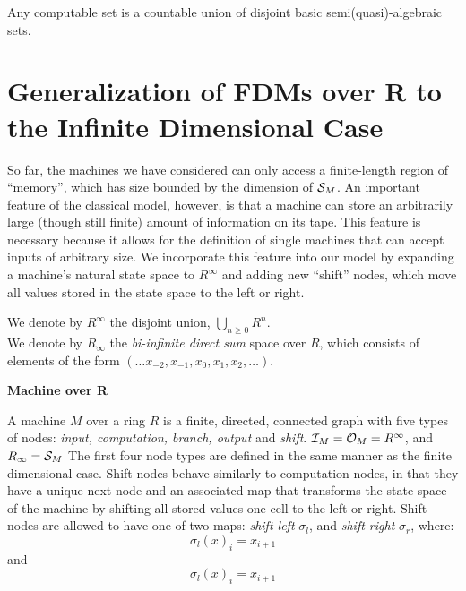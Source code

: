   \begin{corollary}
    Any computable set is a countable union of disjoint basic
    semi(quasi)-algebraic sets.
  \end{corollary}

  \section{Generalization of FDMs over R to the Infinite Dimensional Case}

  So far, the machines we have considered can only access a
  finite-length region of ``memory'', which has size bounded by the
  dimension of $\mathcal{S}_M$.  An important feature of the classical
  model, however, is that a machine can store an arbitrarily large
  (though still finite) amount of information on its tape.  This
  feature is necessary because it allows for the definition of single
  machines that can accept inputs of arbitrary size. We incorporate
  this feature into our model by expanding a machine's natural state
  space to $R^\infty$ and adding new ``shift'' nodes, which move all
  values stored in the state space to the left or right.

  We denote by $R^\infty$ the disjoint union, $\bigcup_{n \geq 0} R^n$.\\

  We denote by $R_\infty$ the \emph{bi-infinite direct sum} space over
  $R$, which consists of elements of the form $(\ldots x_{-2}, x_{-1}, x_0,
  x_1, x_2, \ldots)$.
  
  \begin{definition}{\textbf{Machine over R}}

    A machine $M$ over a ring $R$ is a finite, directed, connected
    graph with five types of nodes: \emph{input, computation, branch,
      output} and \emph{shift}.  $\mathcal{I}_M = \mathcal{O}_M =
    R^\infty$, and $R_\infty = \mathcal{S}_M$ The first four node
    types are defined in the same manner as the finite dimensional
    case.  Shift nodes behave similarly to computation nodes, in that
    they have a unique next node and an associated map that transforms
    the state space of the machine by shifting all stored values one
    cell to the left or right. Shift nodes are allowed to have one of
    two maps: \emph{shift left} $\sigma_l$, and \emph{shift
      right} $\sigma_r$, where:\\

    $$\sigma_l(x)_i = x_{i+1}$$ and $$\sigma_l(x)_i = x_{i+1}$$
  \end{definition}
  
